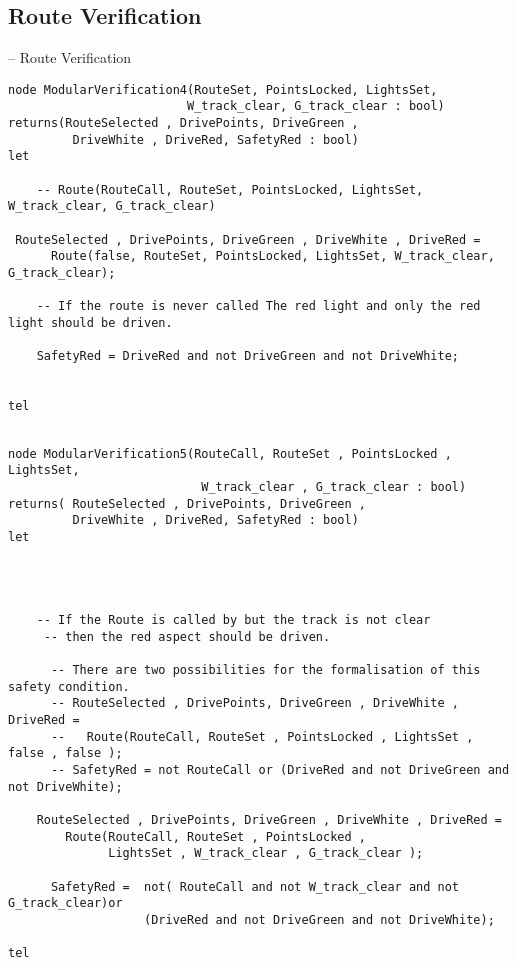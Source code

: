 \subsection{Route Verification}




-- Route Verification

\begin{verbatim}
node ModularVerification4(RouteSet, PointsLocked, LightsSet,
                         W_track_clear, G_track_clear : bool)
returns(RouteSelected , DrivePoints, DriveGreen ,
         DriveWhite , DriveRed, SafetyRed : bool)
let

	-- Route(RouteCall, RouteSet, PointsLocked, LightsSet, W_track_clear, G_track_clear)
	
 RouteSelected , DrivePoints, DriveGreen , DriveWhite , DriveRed = 
      Route(false, RouteSet, PointsLocked, LightsSet, W_track_clear, G_track_clear);

	-- If the route is never called The red light and only the red light should be driven.

	SafetyRed = DriveRed and not DriveGreen and not DriveWhite;
	
	
tel
\end{verbatim}

\begin{verbatim}

node ModularVerification5(RouteCall, RouteSet , PointsLocked , LightsSet,
                           W_track_clear , G_track_clear : bool)
returns( RouteSelected , DrivePoints, DriveGreen ,
         DriveWhite , DriveRed, SafetyRed : bool)
let




	-- If the Route is called by but the track is not clear
     -- then the red aspect should be driven. 
	
      -- There are two possibilities for the formalisation of this safety condition.
      -- RouteSelected , DrivePoints, DriveGreen , DriveWhite , DriveRed = 
      --   Route(RouteCall, RouteSet , PointsLocked , LightsSet , false , false );
      -- SafetyRed = not RouteCall or (DriveRed and not DriveGreen and not DriveWhite);
	
	RouteSelected , DrivePoints, DriveGreen , DriveWhite , DriveRed = 
        Route(RouteCall, RouteSet , PointsLocked ,
              LightsSet , W_track_clear , G_track_clear );
	
      SafetyRed =  not( RouteCall and not W_track_clear and not G_track_clear)or 
                   (DriveRed and not DriveGreen and not DriveWhite);
	
tel
\end{verbatim}
\label{lst:Modver5}


